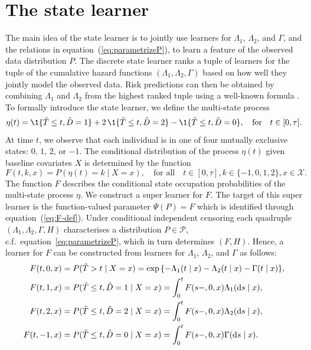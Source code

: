 \section{The state learner}
\label{sec:super-learner-simple}

The main idea of the state learner is to jointly use learners for
\( \Lambda_1 \), \( \Lambda_2 \), and \( \Gamma \), and the relations in
equation~(\ref{eq:parametrizeP}), to learn a feature of the observed data
distribution \( P \). The discrete state learner ranks a tuple of learners for
the tuple of the cumulative hazard functions
\( (\Lambda_1, \Lambda_2, \Gamma) \) based on how well they jointly model the
observed data. Risk predictions can then be obtained by combining
\( \Lambda_1 \) and $\Lambda_2$ from the highest ranked tuple using a well-known
formula \citep{benichou1990estimates, ozenne2017riskregression}. To formally
introduce the state learner, we define the multi-state process
\begin{equation*}
  \eta(t) = \1\{\tilde{T} \leq t, \tilde D=1\} + 2\,\1\{\tilde{T} \leq t, \tilde
  D=2\} - \1\{\tilde{T} \leq t, \tilde D=0\},
  \quad \text{for} \quad t \in [0, \tau].
\end{equation*}
At time \(t\), we observe that each individual is in one of four mutually
exclusive states: \( 0 \), \( 1 \), \( 2 \), or \( -1 \).
The conditional distribution of the process \( \eta(t) \) given
baseline covariates \( X \) is determined by the function
\begin{equation}
  \label{eq:F-def}
  F(t, k, x) = P(\eta(t) = k \mid X=x),
  \quad \text{for all} \quad
  t \in [0,\tau],
  k \in \{-1,0,1,2\},
  x \in \mathcal{X}.
\end{equation}
The function \( F \) describes the conditional state occupation probabilities of
the multi-state process \(\eta\). We construct a super learner for \( F \). The
target of this super learner is the function-valued parameter $\Psi(P) = F$
which is identified through equation~(\ref{eq:F-def}). Under conditional
independent censoring each quadruple $(\Lambda_{1}, \Lambda_{2}, \Gamma, H)$
characterises a distribution \(P\in\mathcal P\), c.f.\
equation~\eqref{eq:parametrizeP}, which in turn determines \( (F, H) \). Hence,
a learner for \( F \) can be constructed from learners for \( \Lambda_1 \),
\( \Lambda_2 \), and $\Gamma$ as follows:
\begin{equation}\label{eq:transition}
  \begin{split}
    F(t, 0, x)
    &
      = P(\tilde{T} > t \mid X= x)
      =
      \exp{{\{-\Lambda_{1}(t \mid x)-\Lambda_{2}(t \mid x) - \Gamma(t \mid x)\}
      }},
    \\
    F(t, 1, x)
    &
      = P(\tilde{T} \leq t, \tilde{D}=1 \mid X=x)
      = \int_0^t F(s-, 0, x)  \Lambda_{1}(\mathop{}\!\mathrm{d} s \mid x),
    \\
    F(t, 2, x)
    &
      = P(\tilde{T} \leq t, \tilde{D}=2 \mid X=x)
      = \int_0^t  F(s-, 0, x)  \Lambda_{2}(\mathop{}\!\mathrm{d} s \mid x),
    \\
    F(t, -1, x)
    &
      = P(\tilde{T} \leq t, \tilde{D}=0 \mid X=x)
      = \int_0^t F(s-, 0, x)  \Gamma(\mathop{}\!\mathrm{d} s \mid x).
  \end{split}
\end{equation}
